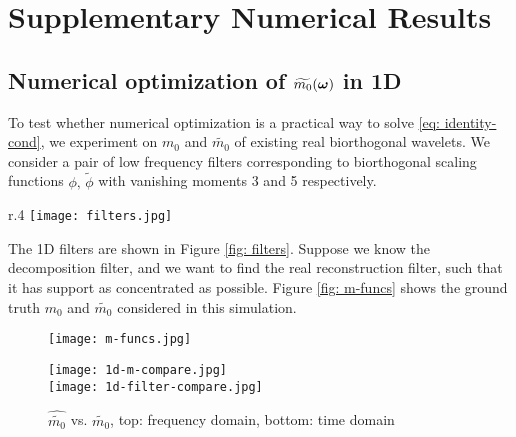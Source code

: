 \section{Supplementary Numerical Results}\label{app: supp-numerical}
\subsection{Numerical optimization of $\widetilde{m_{0}}(\boldsymbol{\omega})$ in 1D}\label{subsec: 1D-opt}
To test whether numerical optimization is a practical way to solve \eqref{eq: identity-cond}, we experiment on $m_0$ and $\widetilde{m_0}$ of existing real biorthogonal wavelets. We consider a pair of low frequency filters corresponding to biorthogonal scaling functions $\phi,\, \tilde{\phi}$ with vanishing moments 3 and 5 respectively. 

\begin{wrapfigure}{r}{.4\textwidth}
\texttt{[image: filters.jpg]}
\caption{1D filters, up: LoD, down: LoR}
\label{fig: filters}
\end{wrapfigure}
The 1D filters are shown in Figure \ref{fig: filters}. Suppose we know the decomposition filter, and we want to find the real reconstruction filter, such that it has support as concentrated as possible. 
Figure \ref{fig: m-funcs} shows the ground truth $m_0$ and $\widetilde{m_0}$ considered in this simulation. %
\begin{figure}%
\begin{minipage}[t]{.45\textwidth}
\texttt{[image: m-funcs.jpg]}
\caption{$m_0(\omega)$ and $\widetilde{m_0}(\omega)$}
\label{fig: m-funcs}
\end{minipage}
\hfill
\begin{minipage}[t]{.45\textwidth}
\vbox{
\texttt{[image: 1d-m-compare.jpg]}\\
\texttt{[image: 1d-filter-compare.jpg]}
}
\caption{$\widehat{\widetilde{m_0}}$ vs. $\widetilde{m_0}$, top: frequency domain, bottom: time domain}
\label{fig: 1d-compare}
\end{minipage}
\end{figure}

